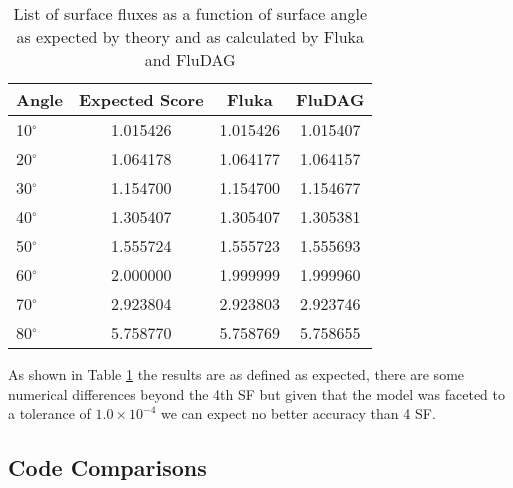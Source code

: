 \documentclass{anstrans}
\begin{document}

\begin{table}[h!]
        \begin{center}
                \begin{tabular}{|l|c|c|c|}
                  \hline
                        Angle & Expected Score & Fluka  & FluDAG \\
                        \hline
                        10$^{\circ}$ & 1.015426 & 1.015426 & 1.015407\\
                        20$^{\circ}$ & 1.064178 & 1.064177 & 1.064157\\
                        30$^{\circ}$ & 1.154700 & 1.154700 & 1.154677\\
                        40$^{\circ}$ & 1.305407 & 1.305407 & 1.305381\\
                        50$^{\circ}$ & 1.555724 & 1.555723 & 1.555693\\
                        60$^{\circ}$ & 2.000000 & 1.999999 & 1.999960\\
                        70$^{\circ}$ & 2.923804 & 2.923803 & 2.923746\\
                        80$^{\circ}$ & 5.758770 & 5.758769 & 5.758655\\
                        \hline
                \end{tabular}
                \caption{List of surface fluxes as a function of surface
                         angle as expected by theory and as calculated by 
                         Fluka and FluDAG}
                \end{center}
\label{usrbdx_crossing}
\end{table}
As shown in Table \ref{usrbdx_crossing} the results are as defined as expected, 
there are some numerical differences beyond the 4th SF but given that the model
was faceted to a tolerance of $1.0\times 10^{-4}$ we can expect no better accuracy 
than 4 SF.

\subsection{Code Comparisons}
\end{document}
